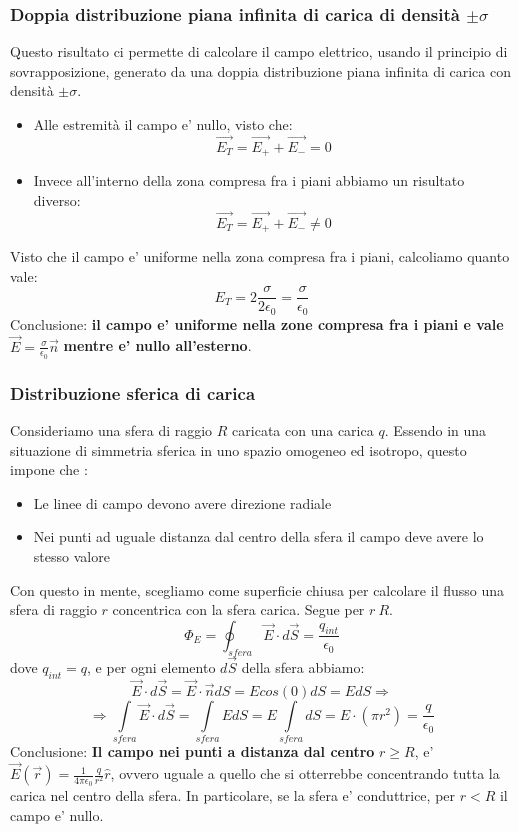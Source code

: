 \documentclass[a4paper, 10pt]{article}
\begin{document}
			\subsubsection{Doppia distribuzione piana infinita di carica di densità $\pm \sigma$}
				Questo risultato ci permette di calcolare il campo elettrico, usando il principio di sovrapposizione, generato
				da una doppia distribuzione piana infinita di carica con densità $\pm \sigma$.
				\begin{itemize}
					\item Alle estremità il campo e' nullo, visto che: 
					\[\overrightarrow{E_T} = \overrightarrow{E_+} + \overrightarrow{E_-} = 0 \]
					\item Invece all'interno della zona compresa fra i piani abbiamo un risultato diverso:
					\[\overrightarrow{E_T} = \overrightarrow{E_+} + \overrightarrow{E_-} \neq 0 \]
				\end{itemize}
				Visto che il campo e' uniforme nella zona compresa fra i piani, calcoliamo quanto vale:
				\[ E_T = 2 \frac{\sigma}{2\epsilon_0} = \frac{\sigma}{\epsilon_0} \]
				Conclusione: \textbf{il campo e' uniforme nella zone compresa fra i piani e vale} $\overrightarrow{E} =
				\frac{\sigma}{\epsilon_0} \overrightarrow{n}$ \textbf{mentre e' nullo all'esterno}.
			\subsubsection{Distribuzione sferica di carica}
				Consideriamo una sfera di raggio $R$ caricata con una carica $q$. 
				Essendo in una situazione di simmetria sferica in uno spazio omogeneo ed isotropo, questo impone che :
				\begin{itemize}
					\item Le linee di campo devono avere direzione radiale
					\item Nei punti ad uguale distanza dal centro della sfera il campo deve avere lo stesso valore
				\end{itemize}
				Con questo in mente, scegliamo come superficie chiusa per calcolare il flusso una sfera di raggio $r$ concentrica
				con la sfera carica. Segue per $r \> R$.
				\[ \Phi_E = \oint_{sfera} \overrightarrow{E} \cdot d\overrightarrow{S} = \frac{q_{int}}{\epsilon_0} \]
				dove $q_{int} = q$, e per ogni elemento $d\overrightarrow{S}$ della sfera abbiamo:
				\[ \overrightarrow{E} \cdot d \overrightarrow{S} = \overrightarrow{E} \cdot \overrightarrow{n}dS 
				= E cos(0) dS = EdS \Rightarrow \]
				\[ \Rightarrow \underset{sfera}{\int} \overrightarrow{E} \cdot d\overrightarrow{S} =
				\underset{sfera}{\int} EdS = E \underset{sfera}{\int} dS = E \cdot ( \pi r^2) = \frac{q}{\epsilon_0} \]
				Conclusione: \textbf{Il campo nei punti a distanza dal centro} $r \geq R$, e' \\
				$\overrightarrow{E}(\overrightarrow{r}) = \frac{1}{4\pi \epsilon_0}\frac{q}{r^2}\widehat{r}$, 
				ovvero uguale a quello che si otterrebbe concentrando tutta la carica nel centro della sfera. 
				In particolare, se la sfera e' conduttrice, per $r < R$ il campo e' nullo.
\end{document}
